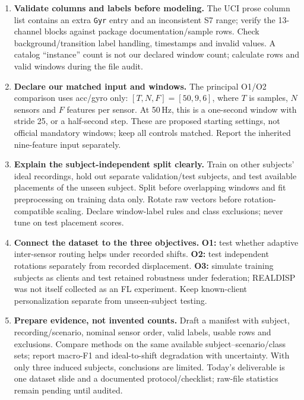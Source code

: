\documentclass[10pt]{article}
\begin{document}
\begin{enumerate}[label=\textbf{\arabic*.},itemsep=4pt]
\item \textbf{Validate columns and labels before modeling.} The UCI prose column list contains an extra \texttt{Gyr} entry and an inconsistent S7 range; verify the 13-channel blocks against package documentation/sample rows. Check background/transition label handling, timestamps and invalid values. A catalog ``instance'' count is not our declared window count; calculate rows and valid windows during the file audit.

\item \textbf{Declare our matched input and windows.} The principal O1/O2 comparison uses acc/gyro only: $[T,N,F]=[50,9,6]$, where $T$ is samples, $N$ sensors and $F$ features per sensor. At 50\,Hz, this is a one-second window with stride 25, or a half-second step. These are proposed starting settings, not official mandatory windows; keep all controls matched. Report the inherited nine-feature input separately.

\item \textbf{Explain the subject-independent split clearly.} Train on other subjects' ideal recordings, hold out separate validation/test subjects, and test available placements of the unseen subject. Split before overlapping windows and fit preprocessing on training data only. Rotate raw vectors before rotation-compatible scaling. Declare window-label rules and class exclusions; never tune on test placement scores.

\item \textbf{Connect the dataset to the three objectives.} \textbf{O1:} test whether adaptive inter-sensor routing helps under recorded shifts. \textbf{O2:} test independent rotations separately from recorded displacement. \textbf{O3:} simulate training subjects as clients and test retained robustness under federation; REALDISP was not itself collected as an FL experiment. Keep known-client personalization separate from unseen-subject testing.

\item \textbf{Prepare evidence, not invented counts.} Draft a manifest with subject, recording/scenario, nominal sensor order, valid labels, usable rows and exclusions. Compare methods on the same available subject--scenario/class sets; report macro-F1 and ideal-to-shift degradation with uncertainty. With only three induced subjects, conclusions are limited. Today's deliverable is one dataset slide and a documented protocol/checklist; raw-file statistics remain pending until audited.
\end{enumerate}
\end{document}
